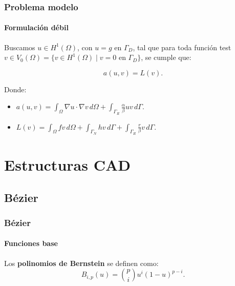 \documentclass[compress]{beamer}
\newtheorem{proposition}[theorem]{Proposición}
\begin{document}
\begin{frame}
	\frametitle{Problema modelo}
	\framesubtitle{Formulación débil}
	\begin{definition} Buscamos  $u \in H^1(\Omega)$, con $u=g \text{ en } \Gamma_D$, tal que para toda función test 
	$v \in V_0(\Omega)=\{v \in H^1(\Omega) \mid v=0 \text{ en } \Gamma_D\}$, se cumple que:

	\begin{equation*}
		\label{eq:form_weak}
		a(u,v)=L(v).
	\end{equation*}

	Donde:
	\begin{itemize}
		\item ${a(u,v)}=\int_{\Omega}\nabla u \cdot \nabla v\, d\Omega + \int_{\Gamma_R}\frac{\alpha}{\beta}uv\, d\Gamma$.
		\item ${L(v)}=\int_{\Omega}fv \, d\Omega+\int_{\Gamma_N}hv\, d\Gamma+\int_{\Gamma_R}\frac{r}{\beta}v\, d\Gamma$.
	\end{itemize}
	\end{definition}
\end{frame}


\section{Estructuras CAD}

\subsection{Bézier}

\begin{frame}
	\frametitle{Bézier}
	\framesubtitle{Funciones base} %
	
	\begin{definition}
		Los \textbf{polinomios de Bernstein} se definen como: $$B_{i,p}(u) = \binom{p}{i} u^{i} (1-u)^{p-i}.$$
	\end{definition}

\end{frame}
\end{document}
